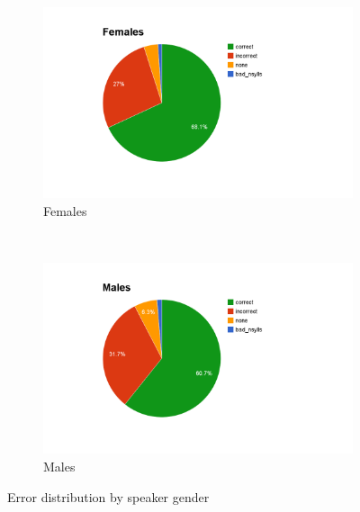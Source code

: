 			\begin{figure}[htb]
				\centering
				\begin{subfigure}[t]{0.5\textwidth}
					\includegraphics[width=\textwidth]{img/annotation/femalePie}
					\caption{Females}
					\label{fig:results:genderpies:female}
				\end{subfigure}%
				~
				\begin{subfigure}[t]{0.5\textwidth}
					\includegraphics[width=\textwidth]{img/annotation/malePie}
					\caption{Males}
					\label{fig:results:genderpies:male}
				\end{subfigure}%
				\caption{Error distribution by speaker gender}
				\label{fig:results:genderpies}
			\end{figure}	
			
			
			
